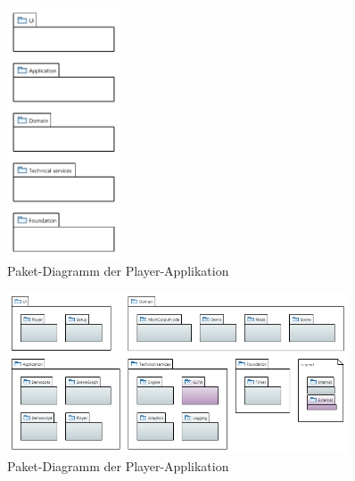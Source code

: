 \begin{figure}[H]
    \centering
    \includegraphics[width=0.3\textwidth]{img/layers.pdf}
    \caption{Paket-Diagramm der
        Player-Applikation}\label{fig:package-diagram:layers}
\end{figure}

\begin{figure}[H]
    \centering
    \includegraphics[width=0.9\textwidth]{img/player_package_diagram.png}
    \caption{Paket-Diagramm der Player-Applikation}\label{fig:package-diagram:player}
\end{figure}

